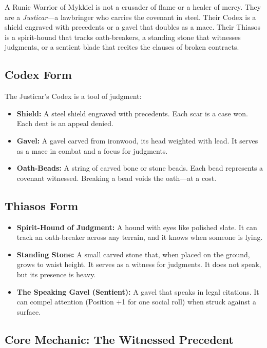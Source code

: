 A Runic Warrior of Mykkiel is not a crusader of flame or a healer of mercy. They are a \textit{Justicar}—a lawbringer who carries the covenant in steel. Their Codex is a shield engraved with precedents or a gavel that doubles as a mace. Their Thiasos is a spirit-hound that tracks oath-breakers, a standing stone that witnesses judgments, or a sentient blade that recites the clauses of broken contracts.

\subsection{Codex Form}

The Justicar's Codex is a tool of judgment:

\begin{itemize}
\item \textbf{Shield:} A steel shield engraved with precedents. Each scar is a case won. Each dent is an appeal denied.
\item \textbf{Gavel:} A gavel carved from ironwood, its head weighted with lead. It serves as a mace in combat and a focus for judgments.
\item \textbf{Oath-Beads:} A string of carved bone or stone beads. Each bead represents a covenant witnessed. Breaking a bead voids the oath—at a cost.
\end{itemize}

\subsection{Thiasos Form}

\begin{itemize}
\item \textbf{Spirit-Hound of Judgment:} A hound with eyes like polished slate. It can track an oath-breaker across any terrain, and it knows when someone is lying.
\item \textbf{Standing Stone:} A small carved stone that, when placed on the ground, grows to waist height. It serves as a witness for judgments. It does not speak, but its presence is heavy.
\item \textbf{The Speaking Gavel (Sentient):} A gavel that speaks in legal citations. It can compel attention (Position +1 for one social roll) when struck against a surface.
\end{itemize}

\subsection{Core Mechanic: The Witnessed Precedent}

